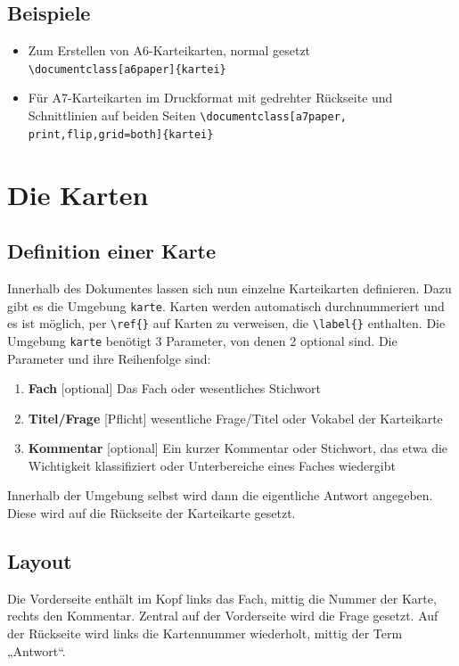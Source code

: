 \documentclass[a4paper,DIV=calc]{scrartcl}
\newcommand{\befehl}[1]{%
\marginpar{\footnotesize\textsf{#1}}%
}
\begin{document}
\subsection{Beispiele}
\begin{itemize}
	\item Zum Erstellen von A6-Karteikarten, normal gesetzt \lstinline!\documentclass[a6paper]{kartei}!
	\item Für A7-Karteikarten im Druckformat mit gedrehter Rückseite und Schnittlinien auf beiden Seiten \lstinline!\documentclass[a7paper, print,flip,grid=both]{kartei}!
\end{itemize}
%
%
%
\section{Die Karten}

\subsection{Definition einer Karte}\befehl{\textbackslash begin\{karte\}}

Innerhalb des Dokumentes lassen sich nun einzelne Karteikarten definieren. Dazu gibt es die Umgebung \lstinline!karte!. Karten werden automatisch durchnummeriert und es ist möglich, per \lstinline!\ref{}! auf Karten zu verweisen, die \lstinline!\label{}! enthalten.
Die Umgebung \lstinline!karte! benötigt 3 Parameter, von denen 2 optional sind. Die Parameter und ihre Reihenfolge sind:
\begin{enumerate}[1.]
	\item \textbf{Fach} [optional] Das Fach oder wesentliches Stichwort
	\item \textbf{Titel/Frage} [Pflicht] wesentliche Frage/Titel oder Vokabel der Karteikarte
	\item \textbf{Kommentar} [optional] Ein kurzer Kommentar oder Stichwort, das etwa die Wichtigkeit klassifiziert oder Unterbereiche eines Faches wiedergibt
\end{enumerate}
Innerhalb der Umgebung selbst wird dann die eigentliche Antwort angegeben. Diese wird auf die Rückseite der Karteikarte gesetzt.

\subsection{Layout}
Die Vorderseite enthält im Kopf links das Fach, mittig die Nummer der Karte, rechts den Kommentar. Zentral auf der Vorderseite wird die Frage gesetzt. Auf der Rückseite wird links die Kartennummer wiederholt, mittig der Term „Antwort“.
\end{document}
